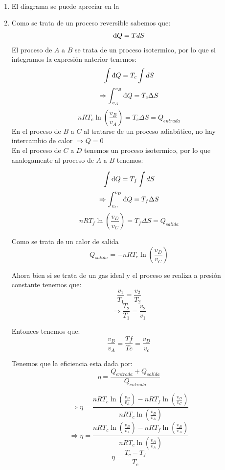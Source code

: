 \begin{enumerate}[label=\textbf{\alph*)}]
      \item{
                  \hfill

                  El diagrama se puede apreciar en la 
            }

      \vspace{\baselineskip}

      \item  Como se trata de un proceso reversible  sabemos que:
            \[ \dbar Q =TdS \]
            El proceso de $A$ a $B$ se trata de un proceso isotermico, por lo que si integramos la expresión anterior tenemos:
            \[ \int \dbar Q =T_{c}\int dS \]
            \[ \Rightarrow \int _{v_A} ^{v_B} \dbar Q = T_{c} \Delta S\]
            \[nRT_c \ln \left( \frac{v_B}{v_A}\right) = T_{c}\Delta S = Q_{entrada}\]
            En el proceso de $B$ a $C$ al tratarse de un proceso adiabático, no hay intercambio de calor $\Rightarrow Q=0$\\

            En  el proceso de $C$ a $D$ tenemos un proceso isotermico, por lo que analogamente al proceso de $A$ a $B$ tenemos:

            \[ \int \dbar Q =T_{f}\int dS \]
            \[ \Rightarrow \int _{v_C} ^{v_D} \dbar Q = T_{f} \Delta S\]
            \[nRT_f \ln \left( \frac{v_D}{v_C}\right) = T_{f}\Delta S = Q_{salida}\]

            Como se trata de un calor de salida
            \[Q_{salida}=-nRT_c \ln \left( \frac{v_D}{v_C}\right)\]


            Ahora bien si  se trata de un gas ideal y el proceso se realiza a presión constante tenemos que:
            \[ \frac{v_1}{T_1}=\frac{v_2}{T_2}\]
            \[\Rightarrow \frac{T_2}{T_1}=\frac{v_2}{v_1}\]

            Entonces tenemos que:
            \[ \frac{v_B}{v_A}=\frac{Tf}{Tc}=\frac{v_D}{v_c}\]

            Tenemos que la eficiencia esta dada por:
            \[ \eta = \frac{Q_{entrada}+ Q_{salida}}{Q_{entrada}}\]

            \[\Rightarrow  \eta = \frac{nRT_c \ln \left( \frac{v_B}{v_A}\right)-nRT_f \ln \left( \frac{v_D}{v_C}\right)}{nRT_c \ln \left( \frac{v_B}{v_A}\right)}\]
            \[\Rightarrow  \eta = \frac{nRT_c \ln \left( \frac{v_B}{v_A}\right)-nRT_f \ln \left( \frac{v_B}{v_A}\right)}{nRT_c \ln \left( \frac{v_B}{v_A}\right)}\]
            \[\eta =\frac{T_c-T_f}{T_c}\]


\end{enumerate}
